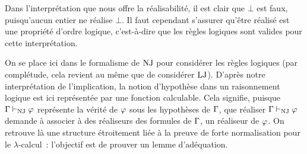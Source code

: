Dans l'interprétation que nous offre la réalisabilité, il est clair que
$\bot$ est faux, puisqu'aucun entier ne réalise $\bot$. Il faut cependant
s'assurer qu'être réalisé est une propriété d'ordre logique, c'est-à-dire que
les règles logiques sont valides pour cette interprétation.

On se place ici dans le formalisme de $\operatorname{NJ}$ pour considérer les règles logiques
(par complétude, cela revient au même que de considérer $\operatorname{LJ}$). D'après notre
interprétation de l'implication, la notion d'hypothèse dans un raisonnement
logique est ici représentée par une fonction calculable. Cela signifie,
puisque $\Gamma\vdash_{\operatorname{NJ}} \varphi$ représente la vérité de $\varphi$ sous les
hypothèses de $\Gamma$, que réaliser $\Gamma\vdash_{\operatorname{NJ}}\varphi$ demande à associer à
des réaliseurs des formules de $\Gamma$, un réaliseur de $\varphi$. On retrouve
là une structure étroitement liée à la preuve de forte normalisation pour le
$\lambda$-calcul~: l'objectif est de prouver un lemme d'adéquation.

